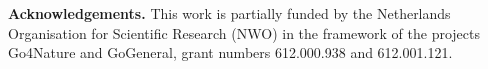 \documentclass[conference]{IEEEtran}
\begin{document}
{\bf Acknowledgements.} {\small This work is partially funded by the Netherlands Organisation for
Scientific Research (NWO) in the framework of the projects Go4Nature and GoGeneral, grant numbers 
612.000.938 and 612.001.121.}

%
%



%
%
\end{document}
